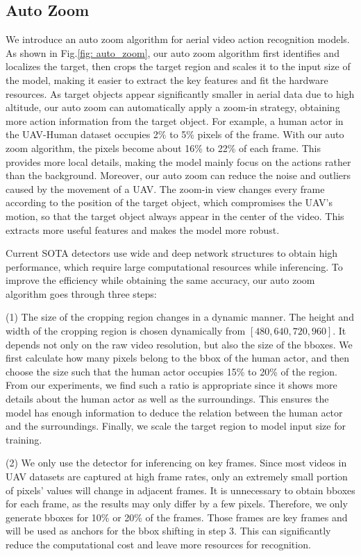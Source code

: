 \documentclass[letterpaper, 10 pt, conference]{ieeeconf}
\begin{document}
\subsection{Auto Zoom}
We introduce an auto zoom algorithm for aerial video action recognition models. As shown in Fig.\ref{fig: auto_zoom}, our auto zoom algorithm first identifies and localizes the target, then crops the target region and scales it to the input size of the model, making it easier to extract the key features and fit the hardware resources. As target objects appear significantly smaller in aerial data due to high altitude, our auto zoom can automatically apply a zoom-in strategy, obtaining more action information from the target object. For example, a human actor in the UAV-Human dataset\cite{li2021uav} occupies 2\% to 5\% pixels of the frame. With our auto zoom algorithm, the pixels become about 16\% to 22\% of each frame. This provides more local details, making the model mainly focus on the actions rather than the background.
Moreover, our auto zoom can reduce the noise and outliers caused by the movement of a UAV. The zoom-in view changes every frame according to the position of the target object, which compromises the UAV's motion, so that the target object always appear in the center of the video. This extracts more useful features and makes the model more robust.




Current SOTA detectors use wide and deep network structures to obtain high performance, which require large computational resources while inferencing. To improve the efficiency while obtaining the same accuracy, our auto zoom algorithm goes through three steps:

\noindent (1) The size of the cropping region changes in a dynamic manner. The height and width of the cropping region is chosen dynamically from $[480, 640, 720, 960]$. It depends not only on the raw video resolution, but also the size of the bboxes. We first calculate how many pixels belong to the bbox of the human actor, and then choose the size such that the human actor occupies 15\% to 20\% of the region. From our experiments, we find such a ratio is appropriate since it shows more details about the human actor as well as the surroundings. This ensures the model has enough information to deduce the relation between the human actor and the surroundings. Finally, we scale the target region to model input size for training.

    \noindent (2) We only use the detector for inferencing on key frames. Since most videos in UAV datasets are captured at high frame rates, only an extremely small portion of pixels' values will change in adjacent frames. It is unnecessary to obtain bboxes for each frame, as the results may only differ by a few pixels. Therefore, we only generate bboxes for 10\% or 20\% of the frames. Those frames are key frames and will be used as anchors for the bbox shifting in step 3. This can significantly reduce the computational cost and leave more resources for recognition.
    
\end{document}
